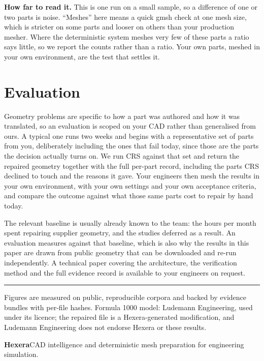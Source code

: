 \documentclass[10pt,onecolumn]{article}
\newcommand{\topic}[1]{\textbf{#1.}\hspace{0.5em}\ignorespaces}
\begin{document}
\topic{How far to read it} This is one run on a small sample, so a difference of one or two parts
is noise. ``Meshes'' here means a quick gmsh check at one mesh size, which is stricter on some
parts and looser on others than your production mesher. Where the deterministic system meshes very few
of these parts a ratio says little, so we report the counts rather than a ratio. Your own parts, meshed in your own
environment, are the test that settles it.

\section{Evaluation}

Geometry problems are specific to how a part was authored and how it was translated, so an
evaluation is scoped on your CAD rather than generalised from ours. A typical one runs two weeks
and begins with a representative set of parts from you, deliberately including the ones that fail
today, since those are the parts the decision actually turns on. We run CRS against that set and
return the repaired geometry together with the full per-part record, including the parts CRS
declined to touch and the reasons it gave. Your engineers then mesh the results in your own
environment, with your own settings and your own acceptance criteria, and compare the outcome
against what those same parts cost to repair by hand today.

The relevant baseline is usually already known to the team: the hours per month spent repairing
supplier geometry, and the studies deferred as a result. An evaluation measures against that
baseline, which is also why the results in this paper are drawn from public geometry that can be
downloaded and re-run independently. A technical paper covering the architecture, the verification
method and the full evidence record is available to your engineers on request.

\vspace{0.6em}
\hrule
\vspace{0.5em}
{\footnotesize Figures are measured on public, reproducible corpora and backed by evidence bundles
with per-file hashes. Formula 1000 model: Ludemann Engineering, used under its licence; the
repaired file is a Hexera-generated modification, and Ludemann Engineering does not endorse Hexera
or these results.\par}

\vspace{0.8em}
\textbf{Hexera}\quad CAD intelligence and deterministic mesh preparation for engineering
simulation.
\end{document}
